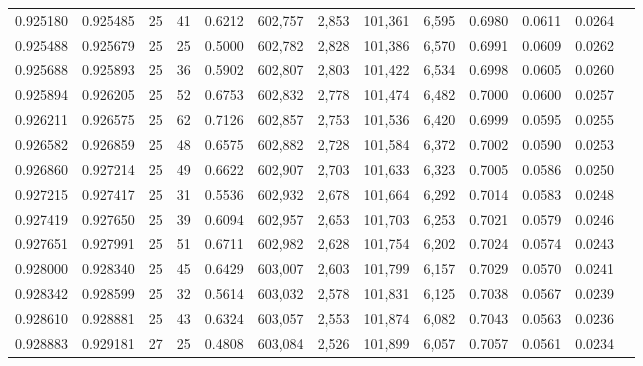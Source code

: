 \begin{tabular}{rrrrrrrrrrrrr}
0.925180 & 0.925485 &    25 &  41 &                                     0.6212 & 602,757 &   2,853 & 101,361 &   6,595 & 0.6980 & 0.0611 & 0.0264 \\
0.925488 & 0.925679 &    25 &  25 &                                     0.5000 & 602,782 &   2,828 & 101,386 &   6,570 & 0.6991 & 0.0609 & 0.0262 \\
0.925688 & 0.925893 &    25 &  36 &                                     0.5902 & 602,807 &   2,803 & 101,422 &   6,534 & 0.6998 & 0.0605 & 0.0260 \\
0.925894 & 0.926205 &    25 &  52 &                                     0.6753 & 602,832 &   2,778 & 101,474 &   6,482 & 0.7000 & 0.0600 & 0.0257 \\
0.926211 & 0.926575 &    25 &  62 &                                     0.7126 & 602,857 &   2,753 & 101,536 &   6,420 & 0.6999 & 0.0595 & 0.0255 \\
0.926582 & 0.926859 &    25 &  48 &                                     0.6575 & 602,882 &   2,728 & 101,584 &   6,372 & 0.7002 & 0.0590 & 0.0253 \\
0.926860 & 0.927214 &    25 &  49 &                                     0.6622 & 602,907 &   2,703 & 101,633 &   6,323 & 0.7005 & 0.0586 & 0.0250 \\
0.927215 & 0.927417 &    25 &  31 &                                     0.5536 & 602,932 &   2,678 & 101,664 &   6,292 & 0.7014 & 0.0583 & 0.0248 \\
0.927419 & 0.927650 &    25 &  39 &                                     0.6094 & 602,957 &   2,653 & 101,703 &   6,253 & 0.7021 & 0.0579 & 0.0246 \\
0.927651 & 0.927991 &    25 &  51 &                                     0.6711 & 602,982 &   2,628 & 101,754 &   6,202 & 0.7024 & 0.0574 & 0.0243 \\
0.928000 & 0.928340 &    25 &  45 &                                     0.6429 & 603,007 &   2,603 & 101,799 &   6,157 & 0.7029 & 0.0570 & 0.0241 \\
0.928342 & 0.928599 &    25 &  32 &                                     0.5614 & 603,032 &   2,578 & 101,831 &   6,125 & 0.7038 & 0.0567 & 0.0239 \\
0.928610 & 0.928881 &    25 &  43 &                                     0.6324 & 603,057 &   2,553 & 101,874 &   6,082 & 0.7043 & 0.0563 & 0.0236 \\
0.928883 & 0.929181 &    27 &  25 &                                     0.4808 & 603,084 &   2,526 & 101,899 &   6,057 & 0.7057 & 0.0561 & 0.0234 \\

\end{tabular}
